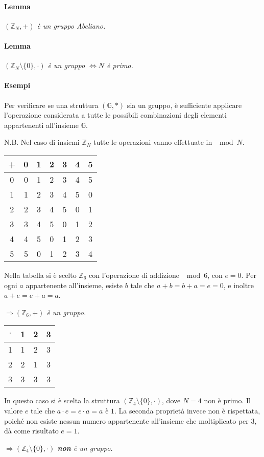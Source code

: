 \documentclass[a4paper]{report}
\begin{document}
\paragraph{Lemma}\textit{$(\mathbb{Z}_N,+)$ è un gruppo Abeliano.}
\paragraph{Lemma}\textit{$(\mathbb{Z}_N\setminus \{ 0\},\cdot )$ è un gruppo $\Leftrightarrow N$ è primo. }
\paragraph{Esempi} Per verificare se una struttura $(\mathbb{G},*)$ sia un gruppo, è sufficiente applicare l'operazione considerata a tutte le possibili combinazioni degli elementi appartenenti all'insieme $\mathbb{G}$.

N.B. Nel caso di insiemi $\mathbb{Z}_N$ tutte le operazioni vanno effettuate in $\mod{N}$.
\begin{center}
\begin{tabular}{ c | c c c c c c}
 + & 0 & 1 & 2 & 3 & 4 & 5 \\ 
 \hline
 0 & 0 & 1 & 2 & 3 & 4 & 5 \\
 1 & 1 & 2 & 3 & 4 & 5 & 0 \\
 2 & 2 & 3 & 4 & 5 & 0 & 1 \\
 3 & 3 & 4 & 5 & 0 & 1 & 2 \\
 4 & 4 & 5 & 0 & 1 & 2 & 3 \\
 5 & 5 & 0 & 1 & 2 & 3 & 4    
\end{tabular}
\end{center}
Nella tabella si è scelto $\mathbb{Z}_6$ con l'operazione di addizione $\mod{6}$, con $e=0$. Per ogni $a$ appartenente all'insieme, esiste $b$ tale che $a+b=b+a=e=0$, e inoltre $a+e=e+a=a$.
\begin{center}
\textit{$\Rightarrow (\mathbb{Z}_6,+)$ è un gruppo.}
\end{center}
\begin{center}
\begin{tabular}{ c | c c c }
$\cdot$ & 1 & 2 & 3\\ 
 \hline
 1 & 1 & 2 & 3 \\
 2 & 2 & 1 & 3 \\
 3 & 3 & 3 & 3 
\end{tabular}
\end{center}
In questo caso si è scelta la struttura $(\mathbb{Z}_4\setminus \{ 0\},\cdot )$, dove $N=4$ non è primo. Il valore $e$ tale che $a\cdot e = e\cdot a = a$ è $1$. La seconda proprietà invece non è rispettata, poiché non esiste nessun numero appartenente all'insieme che moltiplicato per $3$, dà come risultato $e=1$.
\begin{center}
\textit{$\Rightarrow (\mathbb{Z}_4\setminus \{ 0\},\cdot )$ \textbf{non} è un gruppo.}
\end{center}
\end{document}
